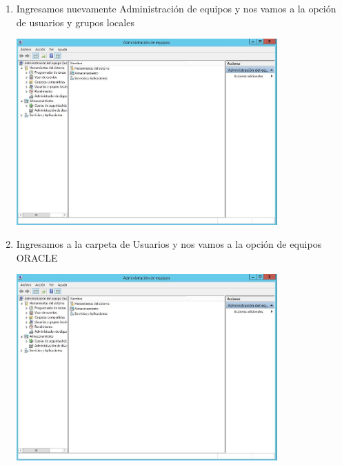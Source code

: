 \begin{enumerate}[1.]
	\hfill \break
	\hfill \break
	\hfill \break
	\hfill \break
	\hfill \break
	\hfill \break
	\hfill \break
	\hfill \break
	\item Ingresamos nuevamente Administraci\'on de equipos y nos vamos a la opci\'on de usuarios y grupos locales\\
	\begin{center}
	\includegraphics[width=10cm]{./Imagenes/img5} 
	\end{center}

	\item Ingresamos a la carpeta de Usuarios y nos vamos a la opci\'on de equipos ORACLE\\
	\begin{center}
	\includegraphics[width=10cm]{./Imagenes/img6} 
	\end{center}


\end{enumerate}
